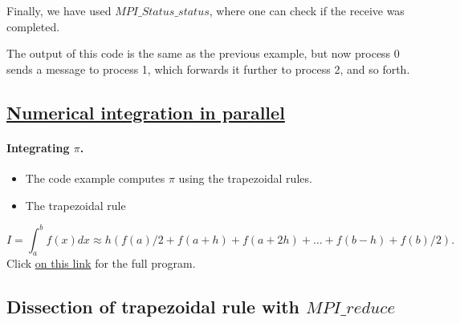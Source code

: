 \documentclass[%
oneside,                 %
final,                   %
10pt]{article}
\begin{document}
Finally,  we have used  $MPI\_Status\_status$,  
where one can check if the receive was completed.

The output of this code is the same as the previous example, but now
process 0 sends a message to process 1, which forwards it further
to process 2, and so forth.



\subsection*{\href{{https://github.com/CompPhysics/ComputationalPhysics2/blob/gh-pages/doc/Programs/LecturePrograms/programs/MPI/chapter07/program6.cpp}}{Numerical integration in parallel}}

\paragraph{Integrating $\pi$.}

\begin{itemize}
\item The code example computes $\pi$ using the trapezoidal rules.

\item The trapezoidal rule
\end{itemize}

\noindent
\[
   I=\int_a^bf(x) dx\approx h\left(f(a)/2 + f(a+h) +f(a+2h)+\dots +f(b-h)+ f(b)/2\right).
\]
Click \href{{https://github.com/CompPhysics/ComputationalPhysics2/blob/gh-pages/doc/Programs/LecturePrograms/programs/MPI/chapter07/program6.cpp}}{on this link} for the full program.



\subsection*{Dissection of trapezoidal rule with $MPI\_reduce$}

\paragraph{}
\end{document}
